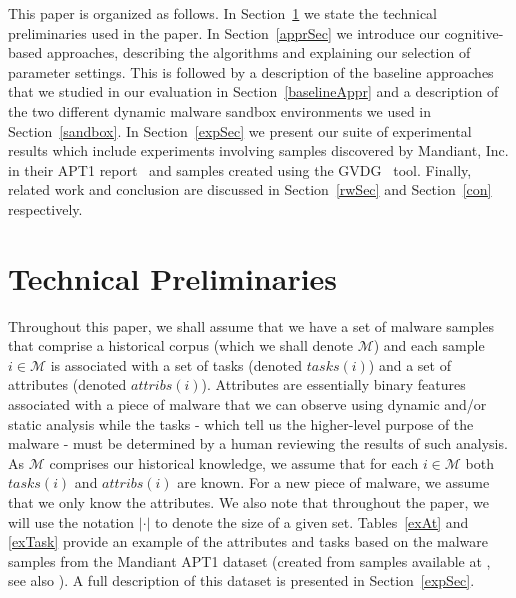 \documentclass[conference]{IEEEtran}
\def\M{\mathcal{M}}
\def\tasks{\textit{tasks}}
\def\attrib{\textit{attribs}}
\begin{document}
This paper is organized as follows. In Section~\ref{tp} we state the technical preliminaries used in the paper. In Section~\ref{apprSec} we introduce our cognitive-based approaches, describing the algorithms and explaining our selection of parameter settings.  This is followed by a description of the baseline approaches that we studied in our evaluation in Section~\ref{baselineAppr} and a description of the two different dynamic malware sandbox environments we used in Section~\ref{sandbox}.  In Section~\ref{expSec} we present our suite of experimental results which include experiments involving samples discovered by Mandiant, Inc. in their APT1 report~\cite{mandiant} and samples created using the GVDG~\cite{gvdg} tool.  Finally, related work and conclusion are discussed in Section~\ref{rwSec} and Section~\ref{con} respectively.

\section{Technical Preliminaries}
\label{tp}
Throughout this paper, we shall assume that we have a set of malware samples that comprise a historical corpus (which we shall denote $\M$) and each sample $i \in \M$ is associated with a set of tasks (denoted $\tasks(i)$) and a set of attributes (denoted $\attrib(i)$).  Attributes are essentially binary features associated with a piece of malware that we can observe using dynamic and/or static analysis while the tasks - which tell us the higher-level purpose of the malware - must be determined by a human reviewing the results of such analysis.  As $\M$ comprises our historical knowledge, we assume that for each $i \in \M$ both $\tasks(i)$ and $\attrib(i)$ are known.  For a new piece of malware, we assume that we only know the attributes.  We also note that throughout the paper, we will use the notation $|\cdot|$ to denote the size of  a given set. Tables~\ref{exAt} and \ref{exTask} provide an example of the attributes and tasks based on the malware samples from the Mandiant APT1 dataset (created from samples available at \cite{apt1sams}, see also \cite{mandiant}).  A full description of this dataset is presented in Section~\ref{expSec}.
\end{document}
